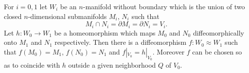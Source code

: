 For $i = 0, 1$ let $W_i$ be an $n$-manifold without boundary which is the union of two closed $n$-dimensional submanifolds $M_i$, $N_i$ such that
\[
M_i \cap N_i = \partial M_i = \partial N_i = V_i.
\]
Let $h: W_0 \rightarrow W_1$ be a homeomorphism which maps $M_0$ and $N_0$ diffeomorphically onto $M_1$ and $N_1$ respectively. Then there is a diffeomorphism $f: W_0 \approx W_1$ such that $f(M_0) = M_1$, $f(N_0) = N_1$ and $f|_{V_0} = h|_{V_0}$. Moreover $f$ can be chosen so as to coincide with $h$ outside a given neighborhood $Q$ of $V_0$.

